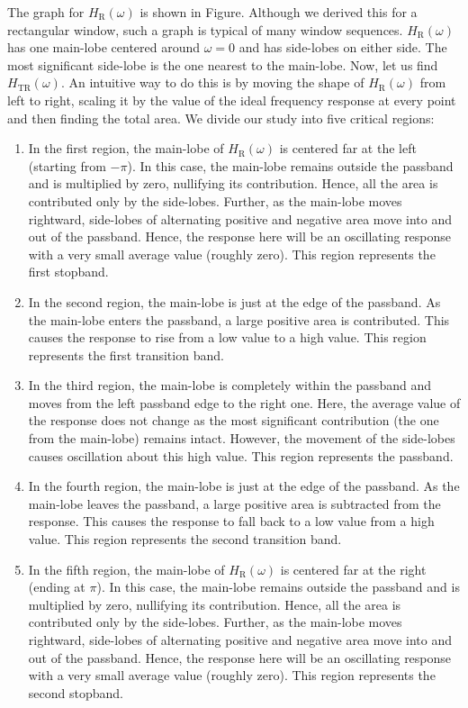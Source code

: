 \documentclass{article}
\theoremstyle{definition}
\begin{document}
The graph for $H_{\text{R}}(\omega)$ is shown in Figure. Although we derived this for a rectangular window, such a graph is typical of many window sequences. $H_{\text{R}}(\omega)$ has one main-lobe centered around $\omega = 0$ and has side-lobes on either side. The most significant side-lobe is the one nearest to the main-lobe. Now, let us find $H_{\text{TR}}(\omega)$. An intuitive way to do this is by moving the shape of $H_{\text{R}}(\omega)$ from left to right, scaling it by the value of the ideal frequency response at every point and then finding the total area. We divide our study into five critical regions: 
\begin{enumerate}
    \item In the first region, the main-lobe of $H_{\text{R}}(\omega)$ is centered far at the left (starting from $-\pi$). In this case, the main-lobe remains outside the passband and is multiplied by zero, nullifying its contribution. Hence, all the area is contributed only by the side-lobes. Further, as the main-lobe moves rightward, side-lobes of alternating positive and negative area move into and out of the passband. Hence, the response here will be an oscillating response with a very small average value (roughly zero). This region represents the first stopband.
    \item In the second region, the main-lobe is just at the edge of the passband. As the main-lobe enters the passband, a large positive area is contributed. This causes the response to rise from a low value to a high value. This region represents the first transition band.
    \item In the third region, the main-lobe is completely within the passband and moves from the left passband edge to the right one. Here, the average value of the response does not change as the most significant contribution (the one from the main-lobe) remains intact. However, the movement of the side-lobes causes oscillation about this high value. This region represents the passband.
    \item In the fourth region, the main-lobe is just at the edge of the passband. As the main-lobe leaves the passband, a large positive area is subtracted from the response. This causes the response to fall back to a low value from a high value. This region represents the second transition band.
    \item In the fifth region, the main-lobe of $H_{\text{R}}(\omega)$ is centered far at the right (ending at $\pi$). In this case, the main-lobe remains outside the passband and is multiplied by zero, nullifying its contribution. Hence, all the area is contributed only by the side-lobes. Further, as the main-lobe moves rightward, side-lobes of alternating positive and negative area move into and out of the passband. Hence, the response here will be an oscillating response with a very small average value (roughly zero). This region represents the second stopband.
\end{enumerate}
\end{document}
